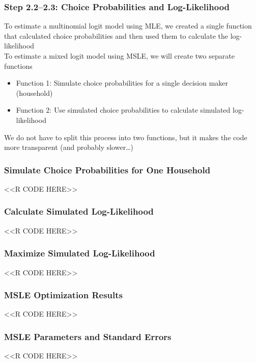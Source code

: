 \documentclass{beamer}
\begin{document}
\begin{frame}\frametitle{Step 2.2--2.3: Choice Probabilities and Log-Likelihood}
    To estimate a multinomial logit model using MLE, we created a single function that calculated choice probabilities and then used them to calculate the log-likelihood \\
    \vspace{2ex}
    To estimate a mixed logit model using MSLE, we will create two separate functions
    \begin{itemize}
    	\item Function 1: Simulate choice probabilities for a single decision maker (household)
    	\item Function 2: Use simulated choice probabilities to calculate simulated log-likelihood
    \end{itemize}
    \vspace{2ex}
    We do not have to split this process into two functions, but it makes the code more transparent (and probably slower\ldots)
\end{frame}

\begin{frame}[fragile]\frametitle{Simulate Choice Probabilities for One Household}
    <<R CODE HERE>>
\end{frame}

\begin{frame}[fragile]\frametitle{Calculate Simulated Log-Likelihood}
    <<R CODE HERE>>
\end{frame}

\begin{frame}[fragile]\frametitle{Maximize Simulated Log-Likelihood}
    <<R CODE HERE>>
\end{frame}

\begin{frame}[fragile]\frametitle{MSLE Optimization Results}
    <<R CODE HERE>>
\end{frame}

\begin{frame}[fragile]\frametitle{MSLE Parameters and Standard Errors}
    <<R CODE HERE>>
\end{frame}
\end{document}

